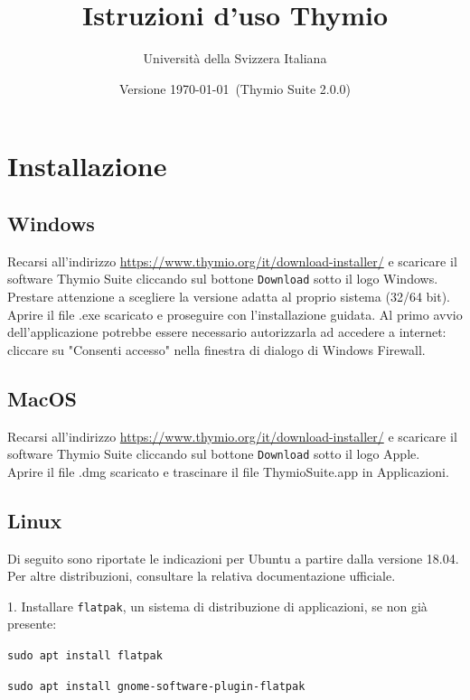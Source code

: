 \documentclass[12pt]{article}
\title{Istruzioni d'uso Thymio}
\author{Università della Svizzera Italiana}
\date{Versione \today \ (Thymio Suite 2.0.0)}
\begin{document}
\maketitle
\tableofcontents
\newpage


\section{Installazione}\label{installation}

	\subsection{Windows}
	
		Recarsi all'indirizzo \url{https://www.thymio.org/it/download-installer/} e scaricare il software Thymio Suite cliccando sul bottone \texttt{Download} sotto il logo Windows. Prestare attenzione a scegliere la versione adatta al proprio sistema (32/64 bit).\\
		Aprire il file .exe scaricato e proseguire con l'installazione guidata. Al primo avvio dell'applicazione potrebbe essere necessario autorizzarla ad accedere a internet: cliccare su "Consenti accesso" nella finestra di dialogo di Windows Firewall.
		
	\subsection{MacOS}
	
		Recarsi all'indirizzo \url{https://www.thymio.org/it/download-installer/} e scaricare il software Thymio Suite cliccando sul bottone \texttt{Download} sotto il logo Apple.\\	
		Aprire il file .dmg scaricato e trascinare il file ThymioSuite.app in Applicazioni.
		
	\subsection{Linux}
	
		Di seguito sono riportate le indicazioni per Ubuntu a partire dalla versione 18.04. Per altre distribuzioni, consultare la relativa documentazione ufficiale.
		
		1. Installare \texttt{flatpak}, un sistema di distribuzione di applicazioni, se non già presente:
		
		\texttt{sudo apt install flatpak}
		
		\texttt{sudo apt install gnome-software-plugin-flatpak}
		
\end{document}
